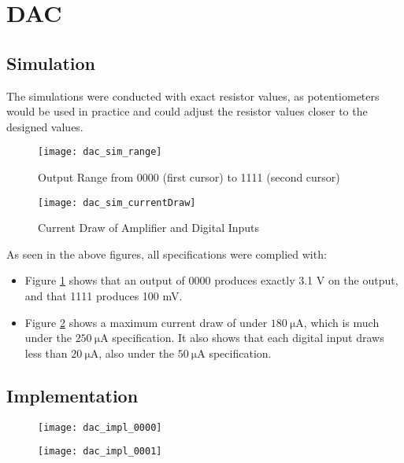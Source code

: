 \graphicspath{{content/3_results/figures}}
\section{DAC}

\subsection{Simulation}

The simulations were conducted with exact resistor values, as potentiometers would be used in practice and could adjust the resistor values closer to the designed values.

\begin{figure}[!htb]
  \centering
  \texttt{[image: dac\_sim\_range]}
  \caption{Output Range from 0000 (first cursor) to 1111 (second cursor)}
  \label{fig:dac_sim_range}
\end{figure}

\begin{figure}[!htb]
  \centering
  \texttt{[image: dac\_sim\_currentDraw]}
  \caption{Current Draw of Amplifier and Digital Inputs}
  \label{fig:dac_sim_currentDraw}
\end{figure}

As seen in the above figures, all specifications were complied with:
\begin{itemize}
    \item Figure \ref{fig:dac_sim_range} shows that an output of 0000 produces exactly 3.1 V on the output, and that 1111 produces 100 mV.
    \item Figure \ref{fig:dac_sim_currentDraw} shows a maximum current draw of under $\SI{180}{\micro\ampere}$, which is much under the $\SI{250}{\micro\ampere}$ specification.
          It also shows that each digital input draws less than $\SI{20}{\micro\ampere}$, also under the $\SI{50}{\micro\ampere}$ specification.
\end{itemize}

\pagebreak

\subsection{Implementation}

\begin{figure}[!htb]
    \centering
    \begin{minipage}{.4\textwidth}
        \centering
        \texttt{[image: dac\_impl\_0000]}
        \label{fig:dac_impl_0000}
    \end{minipage}
    \begin{minipage}{.35\textwidth}
        \centering
        \texttt{[image: dac\_impl\_0001]}
        \label{fig:dac_impl_0001}
    \end{minipage}
\end{figure}

